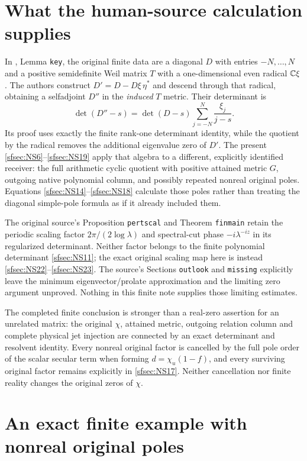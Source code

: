 \section{What the human-source calculation supplies}

In \cite{sfsec:CCM}, Lemma \texttt{key}, the original finite
data are a diagonal $D$ with entries $-N,\ldots,N$ and
a positive semidefinite Weil matrix $T$ with a
one-dimensional even radical $\mathbb C\xi$.
The authors construct $D'=D-D\xi\,\eta^*$ and descend
through that radical, obtaining a selfadjoint $D''$ in
the \emph{induced} $T$ metric. Their determinant is
\[
\det(D''-s)=\det(D-s)\sum_{j=-N}^N\frac{\xi_j}{j-s}.
\]
Its proof uses exactly the finite rank-one determinant
identity, while the quotient by the radical removes
the additional eigenvalue zero of $D'$.
The present \eqref{sfsec:NS6}--\eqref{sfsec:NS19} apply that algebra
to a different, explicitly identified receiver: the
full arithmetic cyclic quotient with positive attained
metric $G$, outgoing native polynomial column, and
possibly repeated nonreal original poles.
Equations \eqref{sfsec:NS14}--\eqref{sfsec:NS18} calculate those
poles rather than treating the diagonal simple-pole
formula as if it already included them.

The original source's Proposition \texttt{pertscal}
and Theorem \texttt{finmain} retain the periodic
scaling factor $2\pi/(2\log\lambda)$ and spectral-cut
phase $-i\lambda^{-iz}$ in its regularized determinant.
Neither factor belongs to the finite polynomial
determinant \eqref{sfsec:NS11}; the exact original scaling
map here is instead \eqref{sfsec:NS22}--\eqref{sfsec:NS23}.
The source's Sections \texttt{outlook} and
\texttt{missing} explicitly leave the minimum
eigenvector/prolate approximation and the limiting
zero argument unproved. Nothing in this finite note
supplies those limiting estimates.

The completed finite conclusion is stronger than a
real-zero assertion for an unrelated matrix: the
original $\chi$, attained metric, outgoing relation
column and complete physical jet injection are
connected by an exact determinant and resolvent
identity. Every nonreal original factor is cancelled
by the full pole order of the scalar secular term
when forming $d=\chi_u(1-f)$, and every
surviving original factor remains explicitly in
\eqref{sfsec:NS17}. Neither cancellation nor finite reality
changes the original zeros of $\chi$.

\section{An exact finite example with nonreal original poles}

